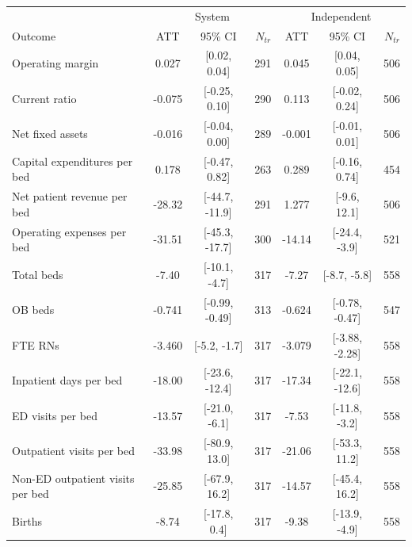 \begin{tabular}{lccrccr}
 & \multicolumn{3}{c}{System} & \multicolumn{3}{c}{Independent} \\
Outcome & ATT & 95\% CI & $N_{tr}$ & ATT & 95\% CI & $N_{tr}$ \\
Operating margin & 0.027 & [0.02, 0.04] & 291 & 0.045 & [0.04, 0.05] & 506 \\
Current ratio & -0.075 & [-0.25, 0.10] & 290 & 0.113 & [-0.02, 0.24] & 506 \\
Net fixed assets & -0.016 & [-0.04, 0.00] & 289 & -0.001 & [-0.01, 0.01] & 506 \\
Capital expenditures per bed & 0.178 & [-0.47, 0.82] & 263 & 0.289 & [-0.16, 0.74] & 454 \\
Net patient revenue per bed & -28.32 & [-44.7, -11.9] & 291 & 1.277 & [-9.6, 12.1] & 506 \\
Operating expenses per bed & -31.51 & [-45.3, -17.7] & 300 & -14.14 & [-24.4, -3.9] & 521 \\
Total beds & -7.40 & [-10.1, -4.7] & 317 & -7.27 & [-8.7, -5.8] & 558 \\
OB beds & -0.741 & [-0.99, -0.49] & 313 & -0.624 & [-0.78, -0.47] & 547 \\
FTE RNs & -3.460 & [-5.2, -1.7] & 317 & -3.079 & [-3.88, -2.28] & 558 \\
Inpatient days per bed & -18.00 & [-23.6, -12.4] & 317 & -17.34 & [-22.1, -12.6] & 558 \\
ED visits per bed & -13.57 & [-21.0, -6.1] & 317 & -7.53 & [-11.8, -3.2] & 558 \\
Outpatient visits per bed & -33.98 & [-80.9, 13.0] & 317 & -21.06 & [-53.3, 11.2] & 558 \\
Non-ED outpatient visits per bed & -25.85 & [-67.9, 16.2] & 317 & -14.57 & [-45.4, 16.2] & 558 \\
Births & -8.74 & [-17.8, 0.4] & 317 & -9.38 & [-13.9, -4.9] & 558 \\
\end{tabular}
